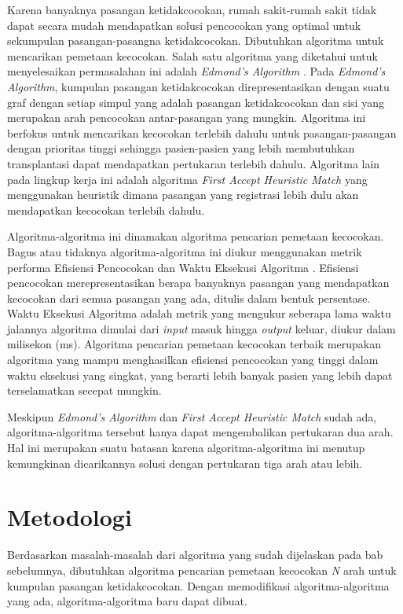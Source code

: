 \documentclass[conference]{IEEEtran}
\begin{document}
Karena banyaknya pasangan ketidakcocokan, rumah sakit-rumah sakit tidak dapat secara mudah mendapatkan solusi pencocokan
yang optimal untuk sekumpulan pasangan-pasangna ketidakcocokan. Dibutuhkan algoritma untuk mencarikan pemetaan kecocokan.
Salah satu algoritma yang diketahui untuk menyelesaikan permasalahan ini adalah \textit{Edmond's Algorithm} \cite{raja}.
Pada \textit{Edmond's Algorithm}, kumpulan pasangan ketidakcocokan direpresentasikan dengan suatu graf dengan setiap simpul
yang adalah pasangan ketidakcocokan dan sisi yang merupakan arah pencocokan antar-pasangan yang mungkin. Algoritma ini berfokus
untuk mencarikan kecocokan terlebih dahulu untuk pasangan-pasangan dengan prioritas tinggi sehingga pasien-pasien yang lebih
membutuhkan transplantasi dapat mendapatkan pertukaran terlebih dahulu. Algoritma lain pada lingkup kerja ini adalah algoritma
\textit{First Accept Heuristic Match} \cite{raja} yang menggunakan heuristik dimana pasangan yang registrasi lebih dulu akan
mendapatkan kecocokan terlebih dahulu.

Algoritma-algoritma ini dinamakan algoritma pencarian pemetaan kecocokan. Bagus atau tidaknya algoritma-algoritma ini diukur
menggunakan metrik performa Efisiensi Pencocokan dan Waktu Eksekusi Algoritma \cite{tullis}. Efisiensi pencocokan merepresentasikan
berapa banyaknya pasangan yang mendapatkan kecocokan dari semua pasangan yang ada, ditulis dalam bentuk persentase. Waktu Eksekusi
Algoritma adalah metrik yang mengukur seberapa lama waktu jalannya algoritma dimulai dari \textit{input} masuk hingga \textit{output}
keluar, diukur dalam milisekon (ms). Algoritma pencarian pemetaan kecocokan terbaik merupakan algoritma yang mampu menghasilkan
efisiensi pencocokan yang tinggi dalam waktu eksekusi yang singkat, yang berarti lebih banyak pasien yang lebih dapat terselamatkan
secepat mungkin.

Meskipun \textit{Edmond's Algorithm} dan \textit{First Accept Heuristic Match} sudah ada, algoritma-algoritma
tersebut hanya dapat mengembalikan pertukaran dua arah. Hal ini merupakan suatu batasan karena algoritma-algoritma
ini menutup kemungkinan dicarikannya solusi dengan pertukaran tiga arah atau lebih.

\section{Metodologi}
Berdasarkan masalah-masalah dari algoritma yang sudah dijelaskan pada bab sebelumnya, dibutuhkan algoritma pencarian
pemetaan kecocokan \textit{N} arah untuk kumpulan pasangan ketidakcocokan. Dengan memodifikasi algoritma-algoritma yang
ada, algoritma-algoritma baru dapat dibuat.
\end{document}
